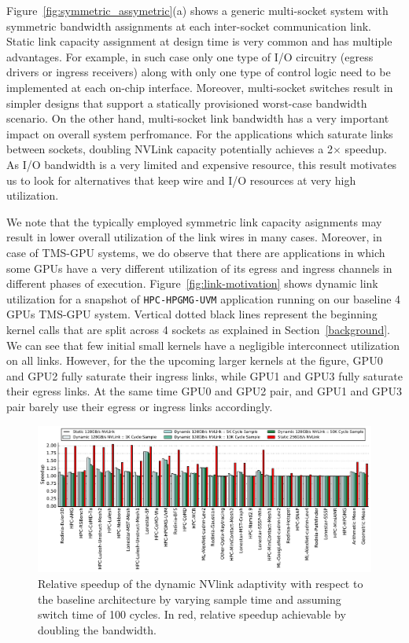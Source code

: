 Figure~\ref{fig:symmetric_assymetric}(a) shows a generic multi-socket system
with symmetric bandwidth assignments at each inter-socket communication link.
Static link capacity assignment at design time is very common and has multiple
advantages. For example, in such case only one type of I/O circuitry (egress
drivers or ingress receivers) along with only one type of control logic need to
be implemented at each on-chip interface. Moreover, multi-socket switches
result in simpler designs that support a statically provisioned worst-case
bandwidth scenario. On the other hand, multi-socket link bandwidth has a very
important impact on overall system perfromance. For the applications which saturate links between sockets, doubling NVLink capacity potentially achieves a 2$\times$ speedup.
As I/O bandwidth is a very limited and expensive resource, this
result motivates us to look for alternatives that keep wire and I/O resources
at very high utilization. 

We note that the typically employed symmetric link
capacity asignments may result in lower overall utilization of the link wires
in many cases. Moreover, in case of TMS-GPU systems, we do observe that there
are applications in which some GPUs have a very different utilization of its
egress and ingress channels in different phases of execution.
Figure~\ref{fig:link-motivation} shows dynamic link utilization for a snapshot
of \texttt{HPC-HPGMG-UVM} application running on our baseline 4 GPUs TMS-GPU
system. Vertical dotted black lines represent the beginning kernel calls that
are split across 4 sockets as explained in Section~\ref{background}. We can see
that few initial small kernels have a negligible interconnect
utilization on all links. However, for the the upcoming larger kernels at the
figure, GPU0 and GPU2 fully saturate their ingress links, while GPU1 and GPU3
fully saturate their egress links. At the same time GPU0 and GPU2 pair,
and GPU1 and GPU3 pair barely use their egress or ingress links accordingly.

\begin{figure}[tp]
    \centering
    \includegraphics[width=1.0\textwidth]{figures/plot_nvlink_sample_time.pdf}
    \caption{Relative speedup of the dynamic NVlink adaptivity with respect to
	the baseline architecture by varying sample time and assuming switch time of
	100 cycles. In red, relative speedup achievable by doubling the bandwidth.}
    \label{fig:sampletime}
\end{figure}

